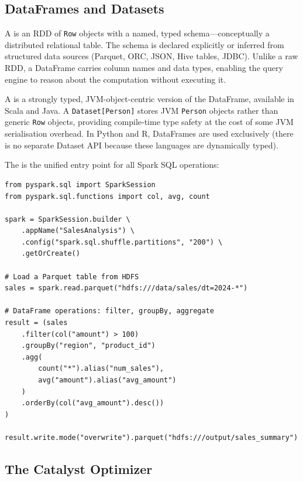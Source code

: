 \subsection{DataFrames and Datasets}
\label{subsec:dataframes}

A  is an RDD of \texttt{Row} objects with a named,
typed schema---conceptually a distributed relational table. The schema
is declared explicitly or inferred from structured data sources (Parquet,
ORC, JSON, Hive tables, JDBC). Unlike a raw RDD, a DataFrame carries
column names and data types, enabling the query engine to reason about
the computation without executing it.

A  is a strongly typed, JVM-object-centric version of
the DataFrame, available in Scala and Java. A \texttt{Dataset[Person]}
stores JVM \texttt{Person} objects rather than generic \texttt{Row}
objects, providing compile-time type safety at the cost of some JVM
serialisation overhead. In Python and R, DataFrames are used exclusively
(there is no separate Dataset API because these languages are dynamically
typed).

The  is the unified entry point for all Spark SQL
operations:

\begin{lstlisting}[style=pyspark, caption={SparkSession creation and DataFrame operations}]
from pyspark.sql import SparkSession
from pyspark.sql.functions import col, avg, count

spark = SparkSession.builder \
    .appName("SalesAnalysis") \
    .config("spark.sql.shuffle.partitions", "200") \
    .getOrCreate()

# Load a Parquet table from HDFS
sales = spark.read.parquet("hdfs:///data/sales/dt=2024-*")

# DataFrame operations: filter, groupBy, aggregate
result = (sales
    .filter(col("amount") > 100)
    .groupBy("region", "product_id")
    .agg(
        count("*").alias("num_sales"),
        avg("amount").alias("avg_amount")
    )
    .orderBy(col("avg_amount").desc())
)

result.write.mode("overwrite").parquet("hdfs:///output/sales_summary")
\end{lstlisting}

\subsection{The Catalyst Optimizer}
\label{subsec:catalyst}

